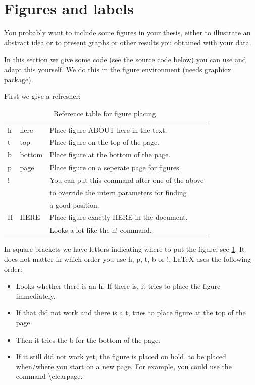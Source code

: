 \documentclass[thesis]{subfiles}
\begin{document}
\section{Figures and labels}
\label{sec:5} %
You probably want to include some figures in your thesis, either to illustrate an abstract idea or to present graphs or other results you obtained with your data.

In this section we give some code (see the source code below) you can use and adapt this yourself.
We do this in the figure environment (needs graphicx package).

First we give a refresher:
\begin{table}[h] %
	\centering
	\begin{tabular}{lll}
		h &	here    & Place figure {ABOUT} here in the text. \\
		t & top     & Place figure on the top of the page. \\
		b & bottom  & Place figure at the bottom of the page. \\
		p &	page    & Place figure on a seperate page for figures. \\
		! &	        & You can put this command after one of the above  \\ 
		&         & to override the intern parameters for finding \\
		&         & a good position. \\
		H & HERE    & Place figure exactly {HERE} in the document. \\
		&         & Looks a lot like the h! command.
	\end{tabular}
	\caption{Reference table for figure placing.}
	\label{tab:location}
\end{table}

In square brackets we have letters indicating where to put the figure, see \ref{tab:location}.
It does not matter in which order you use h, p, t, b or !, \LaTeX{} uses the following order: 
\begin{itemize}
	\item Looks whether there is an h. If there is, it tries to place the figure immediately.
	\item If that did not work and there is a t, tries to place figure at the top of the page.
	\item Then it tries the b for the bottom of the page.
	\item If it still did not work yet, the figure is placed on hold, to be placed when/where you start on a new page. For example, you could use the command \textbackslash clearpage.
\end{itemize}
\end{document}
